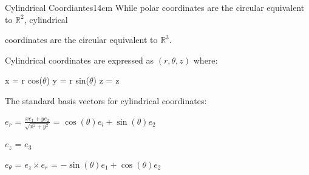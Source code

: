     \vspace{0.5cm}



    \begin{definition}{Cylindrical Coordiantes}{14cm}
        While polar coordinates are the circular equivalent to $\mathbb{R}^2$,
        cylindrical
        
        coordinates are the circular equivalent to $\mathbb{R}^3$.
        
        Cylindrical coordinates are expressed as $(r,\theta,z)$ where:

        \hspace{0.5cm}
        x = r cos($\theta$)
        \hspace{1cm}
        y = r sin($\theta$)
        \hspace{1cm}
        z = z

        \vspace{0.3cm}

        The standard basis vectors for cylindrical coordinates:

        \hspace{0.5cm}
        $e_r$ = $\frac{xe_1 + ye_2}{\sqrt{x^2+y^2}}$
        = $\cos(\theta)e_i + \sin(\theta)e_2$

        \hspace{0.5cm}
        $e_z$ = $e_3$

        \hspace{0.5cm}
        $e_{\theta}$
        = $e_z \times e_r$
        = $-\sin(\theta)e_1 + \cos(\theta)e_2$
    \end{definition}

    \vspace{0.5cm}



